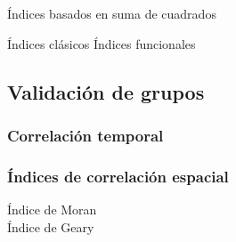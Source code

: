 \documentclass[
]{book}
\begin{document}
Índices basados en suma de cuadrados

Índices clásicos Índices funcionales

\hypertarget{validaciuxf3n-de-grupos}{%
\subsection{Validación de grupos}\label{validaciuxf3n-de-grupos}}

\hypertarget{correlaciuxf3n-temporal}{%
\subsubsection{Correlación temporal}\label{correlaciuxf3n-temporal}}

\hypertarget{uxedndices-de-correlaciuxf3n-espacial-1}{%
\subsubsection{Índices de correlación espacial}\label{uxedndices-de-correlaciuxf3n-espacial-1}}

Índice de Moran\\
Índice de Geary

  
\end{document}
